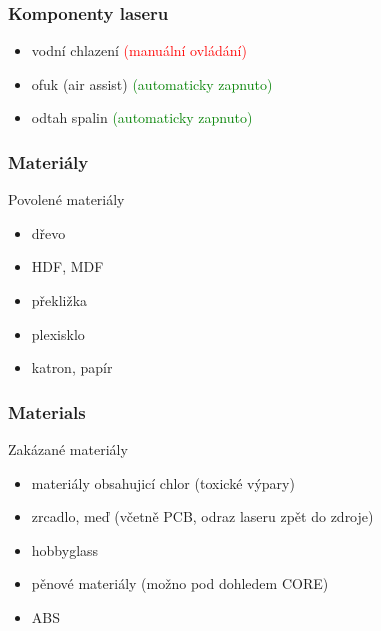 \documentclass[14pt]{beamer}
\begin{document}
\begin{frame}
\frametitle{Komponenty laseru}
\begin{itemize}
	
	\item vodní chlazení \textcolor{red}{(manuální ovládání)}
	\item ofuk (air assist) \textcolor{green}{(automaticky zapnuto)}
	\item odtah spalin \textcolor{green}{(automaticky zapnuto)}
	
\end{itemize}
\end{frame}








\begin{frame}
\frametitle{Materiály}


\begin{examples}{Povolené materiály}
	\begin{itemize}
		\item dřevo
		\item HDF, MDF
		\item překližka
		\item plexisklo
		\item katron, papír
	\end{itemize}
\end{examples}




\end{frame}

\begin{frame}
\frametitle{Materials}

\begin{alertblock}{Zakázané materiály}
	\begin{itemize}
		\item materiály obsahujicí chlor (toxické výpary)
		\item zrcadlo, meď (včetně PCB, odraz laseru zpět do zdroje)
		\item hobbyglass
		\item pěnové materiály (možno pod dohledem CORE)
		\item ABS
	\end{itemize}
\end{alertblock}

\end{frame}
\end{document}
